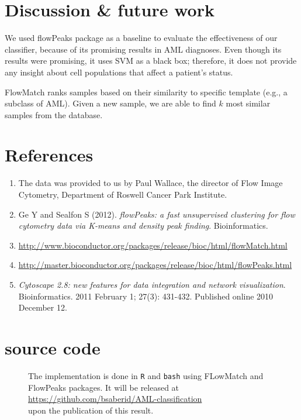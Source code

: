 \documentclass[landscape]{sciposter}
\begin{document}
\begin{multicols}{5}
\columnbreak
\section*{Discussion \& future work}
We used flowPeaks package as a baseline to evaluate the effectiveness of our classifier, because of its promising results in AML diagnoses.
Even though its results were promising, it uses SVM as a black box; therefore, it does not provide any insight about cell populations that affect a patient's status.

FlowMatch ranks samples based on their similarity to specific template (e.g., a subclass of AML). Given a new sample, we are able to find $k$ most similar samples from the database.

\section*{References}
\begin{enumerate}
\item The data was provided to us by Paul Wallace, the director of Flow Image Cytometry, Department of Roswell Cancer Park Institute.
\item Ge Y and Sealfon S (2012). \textit{flowPeaks: a fast unsupervised clustering for flow cytometry data via K-means and density peak finding}. Bioinformatics.\\
\item \url{http://www.bioconductor.org/packages/release/bioc/html/flowMatch.html}
\item \url{http://master.bioconductor.org/packages/release/bioc/html/flowPeaks.html}
\item \textit{Cytoscape 2.8: new features for data integration and network visualization}. Bioinformatics. 2011 February 1; 27(3): 431-432. Published online 2010 December 12.
\end{enumerate}

\section*{source code}
\begin{figure}
\begin{minipage}[b]{\linewidth}
The implementation is done in \texttt{R} and \texttt {bash} using FLowMatch and FlowPeaks packages.
It will be released at\\
\hspace{2cm} \url{https://github.com/bsaberid/AML-classification} \\
upon the publication of this result.\\
\end{minipage}
\end{figure}
\end{multicols}
\end{document}
